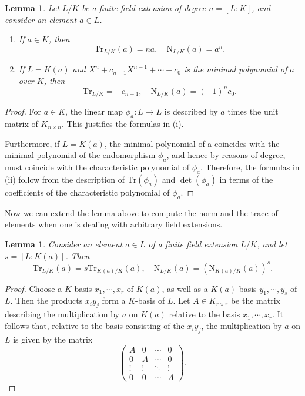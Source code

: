 \documentclass[12pt]{report}
\newtheorem{lemma}[theorem]{Lemma}
\theoremstyle{definition}
\newcommand{\Tr}{\text{Tr}}
\newcommand{\nm}{\text{N}}
\begin{document}
\begin{lemma}
	Let $L/K$ be a finite field extension of degree $n = [L : K]$, and consider an element $a \in L$.
	\begin{enumerate}
		\item If $a \in K$, then
		      $$\Tr_{L/K}(a) = na,\quad \nm_{L/K}(a) = a^n.$$
		\item If $L = K(a)$ and $X^n + c_{n-1}X^{n-1} +\cdots + c_0$ is the minimal polynomial of $a$ over $K$, then
		      $$\Tr_{L/K}=-c_{n-1},\quad \nm_{L/K}(a)=(-1)^nc_0.$$
	\end{enumerate}
\end{lemma}

\begin{proof}
	For $a \in K$, the linear map $\phi_a : L \to L$ is described by $a$ times the unit matrix of $K_{n\times n}$. This justifies the formulas in (i).


	Furthermore, if $L = K(a)$, the minimal polynomial of a coincides with the minimal polynomial of the endomorphism $\phi_a$, and hence by reasons of degree, must coincide with the characteristic polynomial of $\phi_a$. Therefore, the formulas in (ii) follow from the description of $\Tr(\phi_a)$ and $\det(\phi_a)$ in terms of the coefficients of the characteristic polynomial of $\phi_a$.
\end{proof}


Now we can extend the lemma above to compute the norm and the trace of elements when one is dealing with arbitrary field extensions.

\begin{lemma}
	Consider an element $a \in L$ of a finite field extension $L/K$, and let $s = [L : K(a)]$. Then $$\Tr_{L/K}(a)=s\Tr_{K(a)/K}(a),\quad \nm_{L/K}(a)=(\nm_{K(a)/K}(a))^s.$$
\end{lemma}

\begin{proof}
	Choose a $K$-basis $x_1, \cdots , x_r$ of $K(a)$, as well as a $K(a)$-basis $y_1, \cdots , y_s$ of $L$. Then the products $x_iy_j$ form a $K$-basis of $L$. Let $A \in K_{r\times r}$ be the matrix describing the multiplication by $a$ on $K(a)$ relative to the basis $x_1, \cdots , x_r$. It follows that, relative to the basis consisting of the $x_iy_j$, the multiplication by $a$ on $L$ is given by the matrix
	$$\begin{pmatrix}
			A      & 0      & \cdots & 0      \\
			0      & A      & \cdots & 0      \\
			\vdots & \vdots & \ddots & \vdots \\
			0      & 0      & \cdots & A
		\end{pmatrix}.$$
\end{proof}
\end{document}
